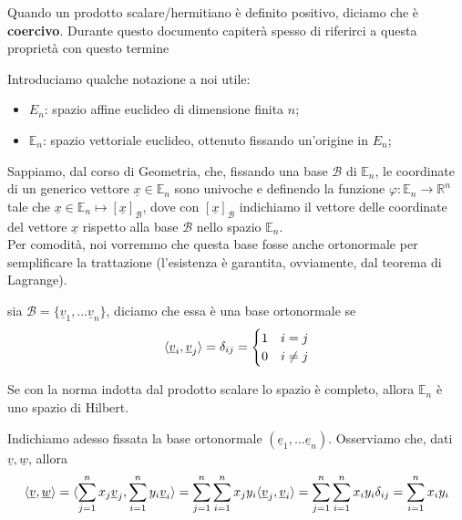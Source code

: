 \documentclass[openany, italian]{book}
\begin{document}
	\begin{remark}
	Quando un prodotto scalare/hermitiano è definito positivo, diciamo che è \textbf{coercivo}. Durante questo documento capiterà spesso di riferirci a questa proprietà con questo termine
	\end{remark}
	\noindent Introduciamo qualche notazione a noi utile:
	\begin{itemize}
		\item $E_n$: spazio affine euclideo di dimensione finita $n$;
		\item $\mathbb{E}_n$: spazio vettoriale euclideo, ottenuto fissando un'origine in $E_n$;
	\end{itemize}
	Sappiamo, dal corso di Geometria, che, fissando una base $\mathcal{B}$ di $\mathbb{E}_n$, le coordinate di un generico vettore $\underline{x} \in \mathbb{E}_n$ sono univoche e definendo la funzione $\varphi: \mathbb{E}_n \to \mathbb{R}^n$ tale che $\underline{x} \in \mathbb{E}_n \mapsto [\underline{x}]_{\mathcal{B}}$, dove con $[\underline{x}]_{\mathcal{B}}$ indichiamo il vettore delle coordinate del vettore $\underline{x}$ rispetto alla base $\mathcal{B}$ nello spazio $\mathbb{E}_n$. \\
Per comodità, noi vorremmo che questa base fosse anche ortonormale per semplificare la trattazione (l'esistenza è garantita, ovviamente, dal teorema di Lagrange). 
\begin{definition}
	sia $\mathcal{B} = \{ \underline{v}_1, \ldots \underline{v}_n \}$, diciamo che essa è una base ortonormale se
	$$
	\langle \underline{v}_i, \underline{v}_j \rangle = \delta_{ij} = \begin{cases} 1 & i = j \\ 0 & i \neq j \end{cases}	
	$$
\end{definition}
\begin{remark}
	Se con la norma indotta dal prodotto scalare lo spazio è completo, allora $\mathbb{E}_n$ è uno spazio di Hilbert.
\end{remark}
\noindent Indichiamo adesso fissata la base ortonormale $(\underline{e}_1, \ldots \underline{e}_n)$. Osserviamo che, dati $\underline{v}, \underline{w}$, allora
$$
\langle \underline{v}, \underline{w} \rangle = \langle \sum_{j=1}^n x_j \underline{v}_j, \sum_{i=1}^n y_i \underline{v}_i \rangle = \sum_{j=1}^n \sum_{i=1}^n x_j y_i \langle \underline{v}_j, \underline{v}_i \rangle = \sum_{j=1}^n \sum_{i=1}^n x_i y_i \delta_{ij} = \sum_{i=1}^n x_i y_i
$$
\end{document}
